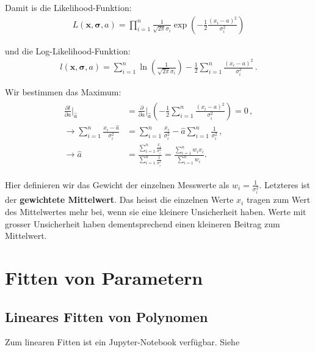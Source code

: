 Damit is die Likelihood-Funktion:
\begin{align}
L(\boldsymbol{x,\sigma}, a) = \prod_{i=1}^n \frac{1}{ \sqrt{2 \pi } \sigma_i} \exp \left( - \frac{1}{2} \frac{ (x_i - a)^2 }{ \sigma_i^2 } \right)
\label{eq:vl8-14}
\end{align}

und die Log-Likelihood-Funktion:
\begin{align}
l(\boldsymbol{x,\sigma}, a) = \sum_{i=1}^n \ln \left( \frac{1}{ \sqrt{2 \pi } \sigma_i} \right) - \frac{1}{2} \sum_{i=1}^n \frac{ (x_i - a)^2 }{ \sigma_i^2 }\,.
\label{eq:vl8-15}
\end{align}

Wir bestimmen das Maximum:
\begin{align}
\begin{split}
\frac{ \partial l }{ \partial a } \bigg|_{\hat{a}} &= \frac{ \partial }{ \partial a } \bigg|_{\hat{a}} \left( - \frac{1}{2} \sum_{i=1}^n \frac{ (x_i - a)^2 }{ \sigma_i^2 } \right) = 0\,,\\
\rightarrow \sum_{i=1}^n \frac{ x_i - \hat{a} }{ \sigma_i^2 } &=  \sum_{i=1}^n \frac{ x_i }{ \sigma_i^2 } - \hat{a} \sum_{i=1}^n \frac{ 1 }{ \sigma_i^2 }\,,\\
\rightarrow \hat{a} &= \frac{ \sum_{i=1}^n \frac{ x_i }{ \sigma_i^2 } }{ \sum_{i=1}^n \frac{ 1 }{ \sigma_i^2 } } =\frac{ \sum_{i=1}^n w_i x_i }{ \sum_{i=1}^n w_i \,}.
\label{eq:vl8-16}
\end{split}
\end{align}

Hier definieren wir das Gewicht der einzelnen Messwerte als $w_i = \frac{1}{\sigma_i^2}$. 
Letzteres ist der \textbf{gewichtete Mittelwert}. Das heisst die einzelnen Werte $x_i$ tragen zum Wert des Mittelwertes mehr bei, wenn sie eine kleinere Unsicherheit haben. Werte mit grosser Unsicherheit haben dementsprechend einen kleineren Beitrag zum Mittelwert.



\chapter{Fitten von Parametern}
 
\section{Lineares Fitten von Polynomen}
\begin{center}
\begin{tcolorbox}[enhanced,width=6in,center upper,
    fontupper=\large,drop fuzzy shadow southwest,
    colframe=blue!50!black,colback=blue!10]
    {Zum linearen Fitten ist ein Jupyter-Notebook verfügbar. Siehe  }
\end{tcolorbox}
\end{center}

